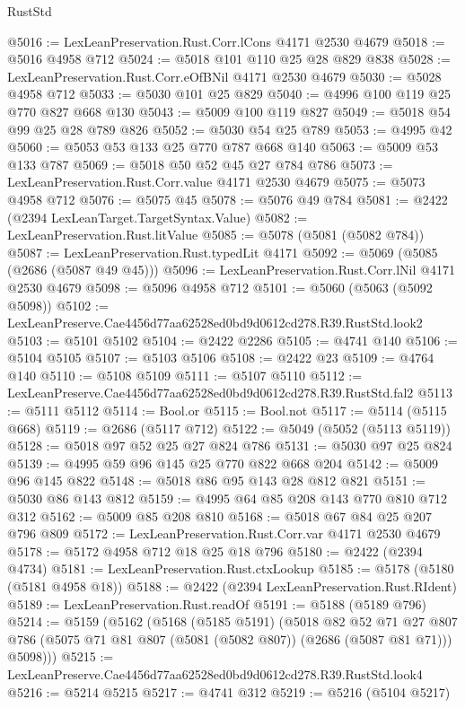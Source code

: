 \begin{lexlean}{RustStd}
\begin{coremodule}
@5016 := LexLeanPreservation.Rust.Corr.lCons @4171 @2530 @4679
@5018 := @5016 @4958 @712
@5024 := @5018 @101 @110 @25 @28 @829 @838
@5028 := LexLeanPreservation.Rust.Corr.eOfBNil @4171 @2530 @4679
@5030 := @5028 @4958 @712
@5033 := @5030 @101 @25 @829
@5040 := @4996 @100 @119 @25 @770 @827 @668 @130
@5043 := @5009 @100 @119 @827
@5049 := @5018 @54 @99 @25 @28 @789 @826
@5052 := @5030 @54 @25 @789
@5053 := @4995 @42
@5060 := @5053 @53 @133 @25 @770 @787 @668 @140
@5063 := @5009 @53 @133 @787
@5069 := @5018 @50 @52 @45 @27 @784 @786
@5073 := LexLeanPreservation.Rust.Corr.value @4171 @2530 @4679
@5075 := @5073 @4958 @712
@5076 := @5075 @45
@5078 := @5076 @49 @784
@5081 := @2422 (@2394 LexLeanTarget.TargetSyntax.Value)
@5082 := LexLeanPreservation.Rust.litValue
@5085 := @5078 (@5081 (@5082 @784))
@5087 := LexLeanPreservation.Rust.typedLit @4171
@5092 := @5069 (@5085 (@2686 (@5087 @49 @45)))
@5096 := LexLeanPreservation.Rust.Corr.lNil @4171 @2530 @4679
@5098 := @5096 @4958 @712
@5101 := @5060 (@5063 (@5092 @5098))
@5102 := LexLeanPreserve.Cae4456d77aa62528ed0bd9d0612cd278.R39.RustStd.look2
@5103 := @5101 @5102
@5104 := @2422 @2286
@5105 := @4741 @140
@5106 := @5104 @5105
@5107 := @5103 @5106
@5108 := @2422 @23
@5109 := @4764 @140
@5110 := @5108 @5109
@5111 := @5107 @5110
@5112 := LexLeanPreserve.Cae4456d77aa62528ed0bd9d0612cd278.R39.RustStd.fal2
@5113 := @5111 @5112
@5114 := Bool.or
@5115 := Bool.not
@5117 := @5114 (@5115 @668)
@5119 := @2686 (@5117 @712)
@5122 := @5049 (@5052 (@5113 @5119))
@5128 := @5018 @97 @52 @25 @27 @824 @786
@5131 := @5030 @97 @25 @824
@5139 := @4995 @59 @96 @145 @25 @770 @822 @668 @204
@5142 := @5009 @96 @145 @822
@5148 := @5018 @86 @95 @143 @28 @812 @821
@5151 := @5030 @86 @143 @812
@5159 := @4995 @64 @85 @208 @143 @770 @810 @712 @312
@5162 := @5009 @85 @208 @810
@5168 := @5018 @67 @84 @25 @207 @796 @809
@5172 := LexLeanPreservation.Rust.Corr.var @4171 @2530 @4679
@5178 := @5172 @4958 @712 @18 @25 @18 @796
@5180 := @2422 (@2394 @4734)
@5181 := LexLeanPreservation.Rust.ctxLookup
@5185 := @5178 (@5180 (@5181 @4958 @18))
@5188 := @2422 (@2394 LexLeanPreservation.Rust.RIdent)
@5189 := LexLeanPreservation.Rust.readOf
@5191 := @5188 (@5189 @796)
@5214 := @5159
    (@5162
      (@5168
        (@5185 @5191)
        (@5018
          @82
          @52
          @71
          @27
          @807
          @786
          (@5075 @71 @81 @807 (@5081 (@5082 @807)) (@2686 (@5087 @81 @71)))
          @5098)))
@5215 := LexLeanPreserve.Cae4456d77aa62528ed0bd9d0612cd278.R39.RustStd.look4
@5216 := @5214 @5215
@5217 := @4741 @312
@5219 := @5216 (@5104 @5217)

\end{coremodule}
\end{lexlean}
